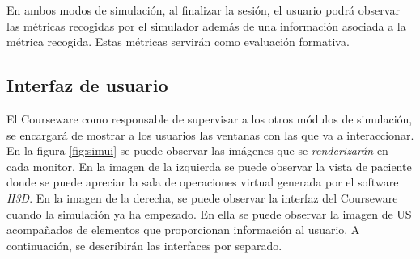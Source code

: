 En ambos modos de simulación, al finalizar la sesión, el usuario podrá observar las métricas recogidas por el simulador además de una información asociada a la métrica recogida. Estas métricas servirán como evaluación formativa.






\subsection{Interfaz de usuario}
\label{course:ui}
El \ac{Courseware} como responsable de supervisar a los otros módulos de simulación, se encargará de mostrar a los usuarios las ventanas con las que va a interaccionar. En la figura \ref{fig:simui} se puede observar las imágenes que se \emph{renderizarán} en cada monitor. En la imagen de la izquierda se puede observar la vista de paciente donde se puede apreciar la sala de operaciones virtual generada por el software \emph{H3D}. En la imagen de la derecha, se puede observar la interfaz del \ac{Courseware} cuando la simulación ya ha empezado. En ella se puede observar la imagen de \ac{US} acompañados de elementos que proporcionan información al usuario. A continuación, se describirán las interfaces por separado.


